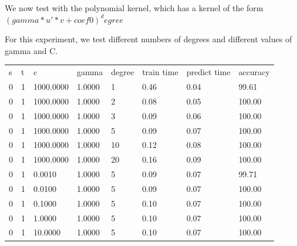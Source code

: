 \documentclass[12pt,oneside]{book}
\begin{document}
%
%

We now test with the polynomial kernel, which has a kernel of the form
$(gamma*u'*v + coef0)^degree$

For this experiment, we test different numbers of degrees and different values of gamma and C.

\begin{table}
\begin{tabular}{|l|l|l|l|l|l|l|l|}
\hline

s               & t               & c               & gamma           & degree          & train time      & predict time    & accuracy        \\
0               & 1               & 1000.0000       & 1.0000          & 1               & 0.46            & 0.04            & 99.61           \\
0               & 1               & 1000.0000       & 1.0000          & 2               & 0.08            & 0.05            & 100.00          \\
0               & 1               & 1000.0000       & 1.0000          & 3               & 0.09            & 0.06            & 100.00          \\
0               & 1               & 1000.0000       & 1.0000          & 5               & 0.09            & 0.07            & 100.00          \\
0               & 1               & 1000.0000       & 1.0000          & 10              & 0.12            & 0.08            & 100.00          \\
0               & 1               & 1000.0000       & 1.0000          & 20              & 0.16            & 0.09            & 100.00          \\
0               & 1               & 0.0010          & 1.0000          & 5               & 0.09            & 0.07            & 99.71           \\
0               & 1               & 0.0100          & 1.0000          & 5               & 0.09            & 0.07            & 100.00          \\
0               & 1               & 0.1000          & 1.0000          & 5               & 0.10            & 0.07            & 100.00          \\
0               & 1               & 1.0000          & 1.0000          & 5               & 0.10            & 0.07            & 100.00          \\
0               & 1               & 10.0000         & 1.0000          & 5               & 0.10            & 0.07            & 100.00          \\

\end{tabular}
\end{table}
\end{document}
